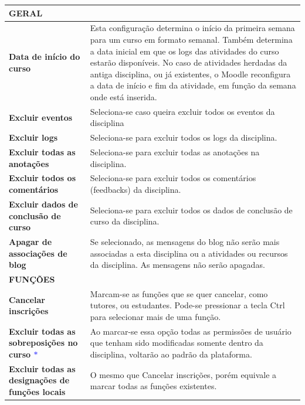 \begin{longtable}[htbp!]{p{6cm}|p{9cm}}
\hline
\rowcolor[rgb]{0.8,0.8,0.8} \textbf{GERAL}&\\\hline
\textbf{Data de início do curso} & Esta configuração determina o início da primeira semana para um curso em formato semanal. Também determina a data inicial em que os logs das atividades do curso estarão disponíveis. No caso de atividades herdadas da antiga disciplina, ou já existentes, o Moodle reconfigura a data de início e fim da atividade, em função da semana onde está inserida.\\\hline
\textbf{Excluir eventos} & Seleciona-se caso queira excluir todos os eventos da disciplina\\\hline
\textbf{Excluir logs} & Seleciona-se para excluir todos os logs da disciplina.\\\hline
\textbf{Excluir todas as anotações} & Seleciona-se para excluir todas as anotações na disciplina.\\\hline
\textbf{Excluir todos os comentários} & Seleciona-se para excluir todos os comentários (feedbacks) da disciplina.\\\hline
\textbf{Excluir dados de conclusão de curso} & Seleciona-se para excluir todos os dados de conclusão de curso da disciplina.\\\hline
\textbf{Apagar de associações de blog} & Se selecionado, as mensagens do blog não serão mais associadas a esta disciplina ou a atividades ou recursos da disciplina. As mensagens não serão apagadas.\\\hline
\rowcolor[rgb]{0.8,0.8,0.8} \textbf{FUNÇÕES}&\\\hline
\textbf{Cancelar inscrições} & Marcam-se as funções que se quer cancelar, como tutores, ou estudantes. Pode-se pressionar a tecla Ctrl para selecionar mais de uma função.\\\hline
\textbf{Excluir todas as sobreposições no curso \textcolor{blue}{$\ast$}} & Ao marcar-se essa opção todas as permissões de usuário que tenham sido modificadas somente dentro da disciplina, voltarão ao padrão da plataforma.\\\hline
\textbf{Excluir todas as designações de funções locais} & O mesmo que Cancelar inscrições, porém equivale a marcar todas as funções existentes.\\\hline

\end{longtable}
